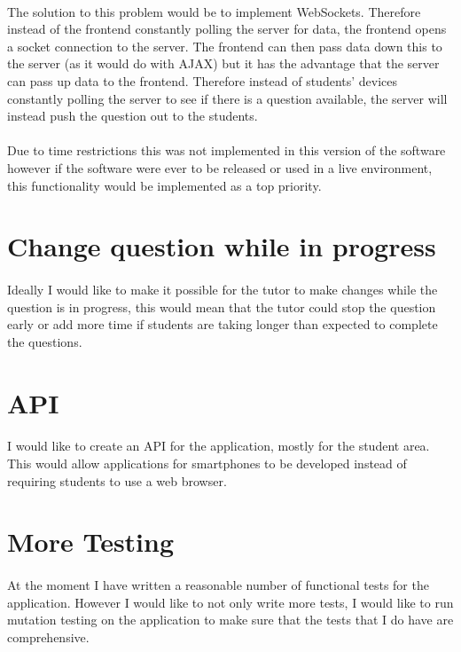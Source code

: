 \documentclass[10pt]{report}
\begin{document}
    \paragraph{}
    The solution to this problem would be to implement WebSockets.  Therefore instead of the frontend
    constantly polling the server for data, the frontend opens a socket connection to the server.  The
    frontend can then pass data down this to the server (as it would do with AJAX) but it has the
    advantage that the server can pass up data to the frontend.  Therefore instead of students' devices 
    constantly polling the server to see if there is a question available, the server will instead push
    the question out to the students.
    
    \paragraph{}
    Due to time restrictions this was not implemented in this version of the software however if the
    software were ever to be released or used in a live environment, this functionality would be
    implemented as a top priority.
    
    \section*{Change question while in progress}
    \paragraph{}
    Ideally I would like to make it possible for the tutor to make changes while the question is in
    progress, this would mean that the tutor could stop the question early or add more time if students
    are taking longer than expected to complete the questions.
    
    \section*{API}
    \paragraph{}
    I would like to create an API for the application, mostly for the student area.  This would allow
    applications for smartphones to be developed instead of requiring students to use a web browser.
    
    \section*{More Testing}
    \paragraph{}
    At the moment I have written a reasonable number of functional tests for the application.  However I
    would like to not only write more tests, I would like to run mutation testing on the application to
    make sure that the tests that I do have are comprehensive.
\end{document}
